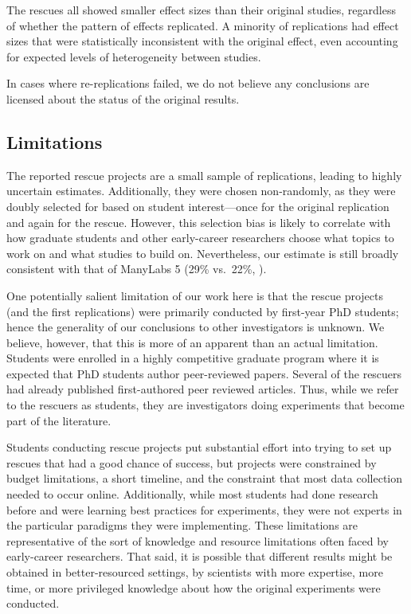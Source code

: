 \documentclass[
  english,
  a4paper,
]{article}
\begin{document}
The rescues all showed smaller effect sizes than their original studies, regardless of whether the pattern of effects replicated.
A minority of replications had effect sizes that were statistically inconsistent with the original effect, even accounting for expected levels of heterogeneity between studies.

In cases where re-replications failed, we do not believe any conclusions are licensed about the status of the original results.

\subsection{Limitations}\label{limitations}

The reported rescue projects are a small sample of replications, leading to highly uncertain estimates.
Additionally, they were chosen non-randomly, as they were doubly selected for based on student interest---once for the original replication and again for the rescue.
However, this selection bias is likely to correlate with how graduate students and other early-career researchers choose what topics to work on and what studies to build on.
Nevertheless, our estimate is still broadly consistent with that of ManyLabs 5 (29\% vs.~22\%, ).

One potentially salient limitation of our work here is that the rescue projects (and the first replications) were primarily conducted by first-year PhD students; hence the generality of our conclusions to other investigators is unknown. We believe, however, that this is more of an apparent than an actual limitation. Students were enrolled in a highly competitive graduate program where it is expected that PhD students author peer-reviewed papers. Several of the rescuers had already published first-authored peer reviewed articles. Thus, while we refer to the rescuers as students, they are investigators doing experiments that become part of the literature.

Students conducting rescue projects put substantial effort into trying to set up rescues that had a good chance of success, but projects were constrained by budget limitations, a short timeline, and the constraint that most data collection needed to occur online. Additionally, while most students had done research before and were learning best practices for experiments, they were not experts in the particular paradigms they were implementing. These limitations are representative of the sort of knowledge and resource limitations often faced by early-career researchers. That said, it is possible that different results might be obtained in better-resourced settings, by scientists with more expertise, more time, or more privileged knowledge about how the original experiments were conducted.
\end{document}
